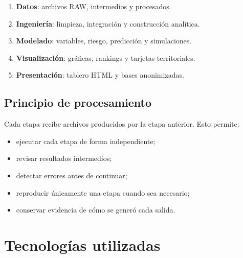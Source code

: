 \documentclass[11pt,a4paper]{article}
\begin{document}
\begin{enumerate}
    \item \textbf{Datos}: archivos RAW, intermedios y procesados.
    \item \textbf{Ingeniería}: limpieza, integración y construcción analítica.
    \item \textbf{Modelado}: variables, riesgo, predicción y simulaciones.
    \item \textbf{Visualización}: gráficas, rankings y tarjetas territoriales.
    \item \textbf{Presentación}: tablero HTML y bases anonimizadas.
\end{enumerate}

\begin{center}
\end{center}

\subsection{Principio de procesamiento}

Cada etapa recibe archivos producidos por la etapa anterior. Esto permite:

\begin{itemize}
    \item ejecutar cada etapa de forma independiente;
    \item revisar resultados intermedios;
    \item detectar errores antes de continuar;
    \item reproducir únicamente una etapa cuando sea necesario;
    \item conservar evidencia de cómo se generó cada salida.
\end{itemize}

\section{Tecnologías utilizadas}
\end{document}
